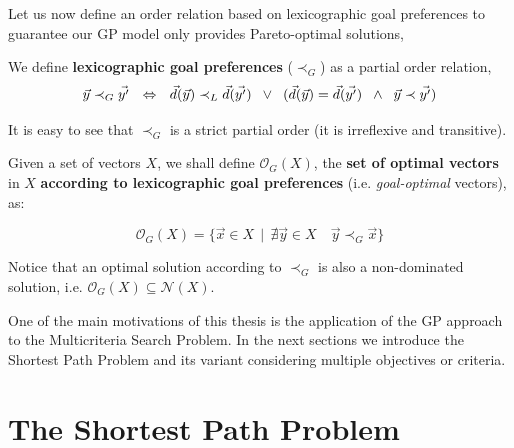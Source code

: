 Let us now define an order relation based on lexicographic goal preferences to guarantee our GP model only provides Pareto-optimal solutions,

\begin{defi}\label{chapMultiObjAlg:lexpreferences}
We define \textbf{lexicographic goal preferences} ($\prec_{G}$) as a partial order relation, 
\begin{equation} \label{eq:goalpref}
 \vec{y} \prec_{G} \vec{y'} \ \ \Leftrightarrow \ \ \vec{d}(\vec{y})
 \prec_{L} \vec{d}(\vec{y'}) \hspace{2 mm} \lor \hspace{2 mm}
 (\vec{d}(\vec{y}) = \vec{d}(\vec{y'}) \hspace{2 mm} \land \hspace{2
   mm} \vec{y} \prec \vec{y'})
\end{equation}

It is easy to see that  $\prec_{G}$ is a strict partial order (it is irreflexive and transitive). 
\end{defi}

\begin{defi}\label{chapMultiObjAlg:goaloptimalvectors}
Given a set of vectors $X$, we shall define $\mathcal{O}_G(X)$, the \textbf{set of optimal vectors} in $X$ \textbf{according to lexicographic goal preferences} (i.e. \emph{goal-optimal} vectors), as:

\begin{equation}\label{eq:goal-optimal-vectors}
  \mathcal{O}_G(X) = \{\vec x \in X \ \ | \ \ \nexists \vec y \in X \quad \vec{y} \prec_{G} \vec{x}\}
\end{equation}

Notice that an optimal solution according to $\prec_{G}$ is also a non-dominated solution, i.e. $\mathcal{O}_G(X) \subseteq \mathcal{N}(X)$.
\end{defi}

One of the main motivations of this thesis is the application of the GP approach to the Multicriteria Search Problem. In the next sections we introduce the Shortest Path Problem and its variant considering multiple objectives or criteria.

\section{The Shortest Path Problem}
\label{chapMultiObjAlg:sec:SPP}

